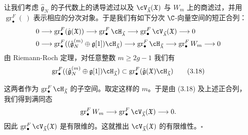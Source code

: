 让我们考虑 $\hat{\mathfrak{g}}_N$ 的子代数上的诱导滤过以及 $\cV_{\vec{\lambda}}(\mathfrak{X})$ 与 $W_m$ 上的商滤过，并用 $\operatorname{gr}^F_{\bullet}(\ )$ 表示相应的分次对象。于是我们有如下分次 $\C$-向量空间的短正合列：
\[
\begin{aligned}
0&\longrightarrow\operatorname{gr}^F_{\bullet}(\hat{\mathfrak{g}}(\mathfrak{X}))\longrightarrow\operatorname{gr}^F_{\bullet}\cH_{\vec{\lambda}}\longrightarrow\operatorname{gr}^F_{\bullet}\cV_{\vec{\lambda}}(\mathfrak{X})\longrightarrow0\\
0&\longrightarrow\operatorname{gr}^F_{\bullet}((\hat{\mathfrak{g}}_N^{(m)}\oplus\mathfrak{g}[1])\cH_{\vec{\lambda}})\longrightarrow\operatorname{gr}^F_{\bullet}\cH_{\vec{\lambda}}\longrightarrow\operatorname{gr}^F_{\bullet}W_m\longrightarrow0
\end{aligned}
\]
由 Riemann-Roch 定理，对任意整数 $m\ge 2g-1$ 我们有
\begin{equation}
\operatorname{gr}^F_{\bullet}((\hat{\mathfrak{g}}_N^{(m)}\oplus\mathfrak{g}[1])\cH_{\vec{\lambda}})
\subset\operatorname{gr}^F_{\bullet}(\hat{\mathfrak{g}}(\mathfrak{X})\cH_{\vec{\lambda}}) \tag{3.18}
\end{equation}


这两者作为 $\operatorname{gr}^F_{\bullet}\cH_{\vec{\lambda}}$ 的子空间。取定这样的 $m$。于是由 (3.18) 及上述正合列，我们得到满同态
\[
\operatorname{gr}^F_{\bullet}W_m\longrightarrow\operatorname{gr}^F_{\bullet}\cV_{\vec{\lambda}}(\mathfrak{X})\longrightarrow0.
\]
因此 $\operatorname{gr}^F_{\bullet}\cV_{\vec{\lambda}}(\mathfrak{X})$ 是有限维的。这就推出 $\cV_{\vec{\lambda}}(\mathfrak{X})$ 的有限维性。\hfill$\square$


